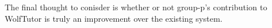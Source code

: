 The final thought to conisder is whether or not group-p's contribution to
WolfTutor is truly an improvement over the existing system.

